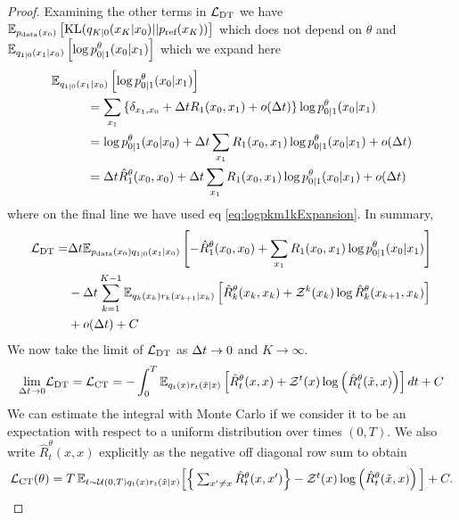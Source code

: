 \documentclass{article}
\begin{document}
\begin{proof}
Examining the other terms in $\mathcal{L}_{\textup{DT}}$ we have $\mathbb{E}_{p_{\textup{data}}(x_0)} \left[  \text{KL} (q_{K|0}(x_K | x_0) || p_{\textrm{ref}}(x_K) ) \right]$ which does not depend on $\theta$ and $\mathbb{E}_{q_{1|0}(x_1|x_0)} \left[ \log p_{0 | 1}^\theta(x_0 | x_1) \right]$ which we expand here
\begin{align}
    &\mathbb{E}_{q_{1|0}(x_{1}|x_{0})} \left[ \log p_{0 | 1}^\theta(x_{0} | x_{1}) \right] \\
    & \hspace{1cm} = \sum_{x_{1}} \left\{ \delta_{x_{1}, x_{0}} + \Delta t R_{1}(x_{0}, x_{1}) + o(\Delta t) \right\} \log p_{0 | 1}^\theta(x_{0} | x_{1})\\
    & \hspace{1cm} = \log p_{0 | 1}^\theta(x_{0} | x_{0}) + \Delta t \sum_{x_{1}} R_{1}(x_{0}, x_{1}) \log p_{0 | 1}^\theta(x_{0} | x_{1}) + o(\Delta t)\\
    & \hspace{1cm} = \Delta t \hat{R}_{1}^\theta(x_{0}, x_{0}) + \Delta t \sum_{x_{1}} R_{1}(x_{0}, x_{1}) \log p_{0 | 1}^\theta(x_{0} | x_{1}) + o(\Delta t)
\end{align}
where on the final line we have used eq \ref{eq:logpkm1kExpansion}. In summary,
\begin{align}
    \mathcal{L}_{\textup{DT}} =& \Delta t \mathbb{E}_{p_{\textup{data}}(x_0) q_{1|0}(x_1 | x_0)} \left[ - \hat{R}_1^\theta(x_0, x_0) + \sum_{x_1} R_1(x_0, x_1) \log p_{0|1}^\theta(x_0 | x_1) \right]\\
    & - \Delta t \sum_{k=1}^{K-1} \mathbb{E}_{q_k(x_k) r_k(x_{k+1} | x_k)} \left[ \hat{R}_k^\theta(x_k, x_k) + \mathcal{Z}^k(x_k) \log \hat{R}_k^\theta (x_{k+1}, x_k) \right]\\
    & + o(\Delta t) + C
\end{align}
We now take the limit of $\mathcal{L}_{\textup{DT}}$ as $\Delta t \rightarrow 0$ and $K \rightarrow \infty$.
\begin{equation}
    \underset{\Delta t \rightarrow 0}{\text{lim}} \mathcal{L}_{\textup{DT}} = \mathcal{L}_{\textup{CT}} = - \int_0^T \mathbb{E}_{q_t(x)r_t(\tilde{x} | x)} \left[\hat{R}_t^\theta(x, x) + \mathcal{Z}^t(x) \log \left( \hat{R}_t^\theta(\tilde{x}, x) \right) \right] dt + C
\end{equation}
We can estimate the integral with Monte Carlo if we consider it to be an expectation with respect to a uniform distribution over times $(0, T)$. We also write $\hat{R}_t^\theta(x, x)$ explicitly as the negative off diagonal row sum to obtain
\begin{equation}
   \textstyle \mathcal{L}_{\textup{CT}}(\theta) = T \, \mathbb{E}_{t\sim \mathcal{U}(0, T) q_t(x) r_t(\tilde{x}|x)} \Big[ \Big\{ \sum_{x' \neq x} \hat{R}_t^\theta(x, x') \Big\} - \mathcal{Z}^t(x) \log \left(\hat{R}_t^\theta(\tilde{x}, x) \right) \Big] + C.
\end{equation}
\end{proof}
\end{document}
